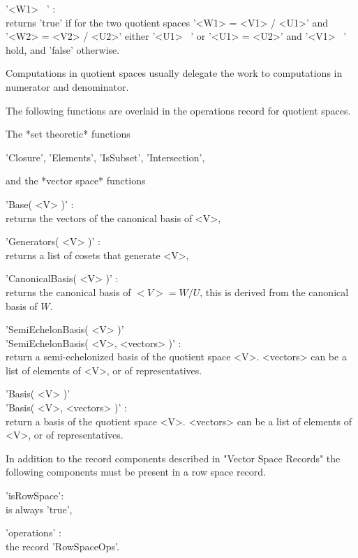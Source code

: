 '<W1> \<\ <W2>' : \\
    returns 'true' if for the two quotient spaces '<W1> = <V1> / <U1>' and
    '<W2> = <V2> / <U2>' either '<U1> \<\ <U2>' or '<U1> = <U2>' and
    '<V1> \<\ <V2>' hold, and 'false' otherwise.


Computations in quotient spaces usually delegate the work to computations in
numerator and denominator.

The following functions are overlaid in the operations record for quotient
spaces.

The *set theoretic* functions

'Closure', 'Elements', 'IsSubset', 'Intersection',

and the *vector space* functions

'Base( <V> )' : \\
    returns the vectors of the canonical basis of <V>,

'Generators( <V> )' : \\
    returns a list of cosets that generate <V>,

'CanonicalBasis( <V> )' : \\
    returns the canonical basis of $<V> = W / U$, this is derived from
    the canonical basis of $W$.

'SemiEchelonBasis( <V> )' \\
'SemiEchelonBasis( <V>, <vectors> )' : \\
    return a semi-echelonized basis of the quotient space <V>.
    <vectors> can be a list of elements of <V>, or of representatives.

'Basis( <V> )' \\
'Basis( <V>, <vectors> )' : \\
    return a basis of the quotient space <V>.
    <vectors> can be a list of elements of <V>, or of representatives.


In addition to  the record components described in "Vector Space Records"
the following components must be present in a row space record.

'isRowSpace': \\
        is always 'true',

'operations' : \\
        the record 'RowSpaceOps'.

